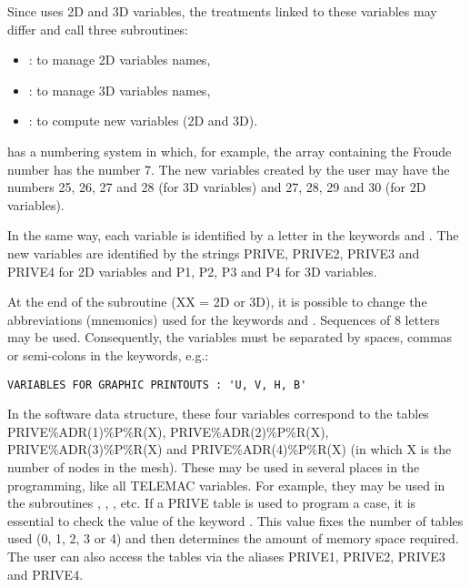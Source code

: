 Since  uses 2D and 3D variables, the treatments linked to these
variables may differ and call three subroutines:

\begin{itemize}
\item  {}: to manage 2D variables names,

\item  {}: to manage 3D variables names,

\item  {}: to compute new variables (2D and 3D).
\end{itemize}

 has a numbering system in which, for example, the array containing
the Froude number has the number 7. The new variables created by the user may
have the numbers 25, 26, 27 and 28 (for 3D variables) and 27, 28, 29 and 30
(for 2D variables).

In the same way, each variable is identified by a letter in the keywords
 and . The new variables are identified by the strings PRIVE,
PRIVE2, PRIVE3 and PRIVE4 for 2D variables and P1, P2, P3 and P4 for 3D
variables.

At the end of the  subroutine (XX = 2D or 3D), it is
possible to change the abbreviations (mnemonics) used for the keywords
 and . Sequences of 8 letters may be used.
Consequently, the variables must be separated by spaces, commas or semi-colons
in the keywords, e.g.:

\begin{lstlisting}[language=TelemacCas]
VARIABLES FOR GRAPHIC PRINTOUTS : 'U, V, H, B'
\end{lstlisting}

In the software data structure, these four variables correspond to the tables
PRIVE\%ADR(1)\%P\%R(X), PRIVE\%ADR(2)\%P\%R(X), PRIVE\%ADR(3)\%P\%R(X) and
PRIVE\%ADR(4)\%P\%R(X) (in which X is the number of nodes in the mesh). These
may be used in several places in the programming, like all TELEMAC variables.
For example, they may be used in the subroutines ,
, , etc.  If a PRIVE table is used to program a
case, it is essential to check the value of the keyword . This value fixes the number of tables used (0, 1, 2, 3 or 4)
and then determines the amount of memory space required. The user can also
access the tables via the aliases PRIVE1, PRIVE2, PRIVE3 and PRIVE4.

